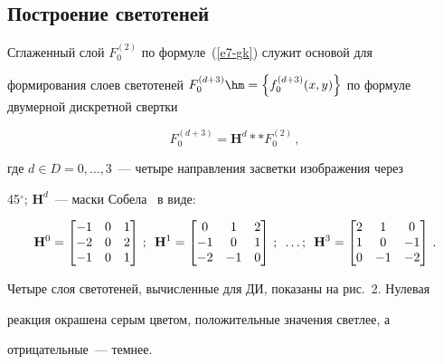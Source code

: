 \subsection{ Построение светотеней} %





  Сглаженный слой $F_0^{(2)}$ по формуле~(\ref{e7-gk}) служит основой для 


формирования слоев светотеней $F_0^{(d+3)} \hm= \left\{ 


f_0^{(d+3)}(x,y)\right\}$ по формуле двумерной дискретной свертки


  \begin{equation}


  F_0^{(d+3)} =\mathbf{H}^{d}** F_0^{(2)}\,,


  \label{e8-gk}


  \end{equation}


где $d\in D=0, \ldots ,3$~--- четыре направления засветки изображения через 


45$^\circ$; $\mathbf{H}^d$~---  маски Собела~\cite{4-gk} в виде:


$$


\mathbf{H}^0=\begin{bmatrix}


-1&0&1\\ -2&0&2\\ -1&0&1\end{bmatrix}\,;


\enskip \mathbf{H}^1 =\begin{bmatrix}


0&1&2\\ -1 & 0& 1\\ -2 & -1& 0\end{bmatrix}\,;\enskip \ldots ;\enskip


\mathbf{H}^3=\begin{bmatrix}


2&1&0\\ 1&0&-1\\ 0&-1&-2 \end{bmatrix}\,.


$$


Четыре слоя светотеней, вычисленные для ДИ, показаны на рис.~2. Нулевая 


реакция окрашена серым цветом, положительные значения светлее, а 


отрицательные~--- темнее.











